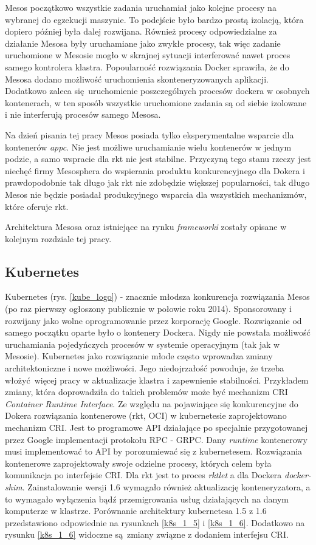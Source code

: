 \documentclass[10pt,a4paper,titlepage,twoside]{report}
\begin{document}
Mesos początkowo wszystkie zadania uruchamiał jako kolejne procesy na wybranej do egzekucji maszynie. To podejście było bardzo prostą izolacją, która dopiero później była dalej rozwijana. Również procesy odpowiedzialne za działanie Mesosa były uruchamiane jako zwykłe procesy, tak więc zadanie uruchomione w Mesosie mogło w skrajnej sytuacji interferować nawet proces samego kontrolera klastra. Popoularność rozwiązania Docker sprawiła, że do Mesosa dodano możliwość uruchomienia skonteneryzowanych aplikacji. Dodatkowo zaleca się uruchomienie poszczególnych procesów dockera w osobnych kontenerach, w ten sposób wszystkie uruchomione zadania są od siebie izolowane i nie interferują procesów samego Mesosa.

Na dzień pisania tej pracy Mesos posiada tylko eksperymentalne wsparcie dla kontenerów \textit{appc}. Nie jest możliwe uruchamianie wielu kontenerów w jednym podzie, a samo wspracie dla rkt nie jest stabilne. Przyczyną tego stanu rzeczy jest niechęć firmy Mesosphera do wspierania produktu konkurencyjnego dla Dokera i prawdopodobnie tak długo jak rkt nie zdobędzie większej popularności, tak długo Mesos nie będzie posiadał produkcyjnego wsparcia dla wszystkich mechanizmów, które oferuje rkt.

Architektura Mesosa oraz istniejące na rynku \textit{frameworki} zostały opisane w kolejnym rozdziale tej pracy. 

\subsection{Kubernetes}

Kubernetes \cite{ad35}(rys. \ref{kube_logo}) - znacznie młodsza konkurencja rozwiązania Mesos (po raz pierwszy ogłoszony publicznie w połowie roku 2014). Sponsorowany i rozwijany jako wolne oprogramowanie przez korporację Google. Rozwiązanie od samego początku oparte było o kontenery Dockera. Nigdy nie powstała możliwość uruchamiania pojedyńczych procesów w systemie operacyjnym (tak jak w Mesosie). Kubernetes jako rozwiązanie młode często wprowadza zmiany architektoniczne i nowe możliwości. Jego niedojrzałość powoduje, że trzeba włożyć więcej pracy w aktualizacje klastra i zapewnienie stabilności. Przykładem zmiany, która doprowadziła do takich problemów może być mechanizm CRI \textit{Container Runtime Interface}. Ze względu na pojawiające się konkurencyjne do Dokera rozwiązania kontenerowe (rkt, OCI) w kubernetesie zaprojektowano mechanizm CRI. Jest to programowe API działające po specjalnie przygotowanej przez Google implementacji protokołu RPC - GRPC. Dany \textit{runtime} kontenerowy musi implementować to API by porozumiewać się z kubernetesem. Rozwiązania kontenerowe zaprojektowały swoje odzielne procesy, których celem była komunikacja po interfejsie CRI. Dla rkt jest to proces \textit{rktlet} a dla Dockera \textit{docker-shim}. Zainstalowanie wersji 1.6 wymagało również aktualizację konteneryzatora, a to wymagało wyłączenia bądź przemigrowania usług działających na danym komputerze w klastrze. Porównanie architektury kubernetesa 1.5 z 1.6 przedstawiono odpowiednie na rysunkach \ref{k8s_1_5} i \ref{k8s_1_6}. Dodatkowo na rysunku \ref{k8s_1_6} widoczne są zmiany związne z dodaniem interfejsu CRI.
\end{document}

